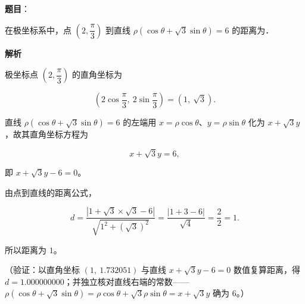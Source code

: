 \begin{answer}

\textbf{题目}：

在极坐标系中，点 \(\left(2,\dfrac{\pi}{3}\right)\) 到直线 \(\rho\left(\cos\theta+\sqrt{3}\sin\theta\right)=6\) 的距离为\gkblank{}．

\textbf{解析}

极坐标点 \(\left(2,\dfrac{\pi}{3}\right)\) 的直角坐标为

\nopagebreak[4]
\[
\left(2\cos\frac{\pi}{3},\ 2\sin\frac{\pi}{3}\right)=(1,\ \sqrt{3}).
\]

直线 \(\rho(\cos\theta+\sqrt{3}\sin\theta)=6\) 的左端用 \(x=\rho\cos\theta\)、\(y=\rho\sin\theta\) 化为 \(x+\sqrt{3}y\)，故其直角坐标方程为

\nopagebreak[4]
\[
x+\sqrt{3}y=6,
\]

即 \(x+\sqrt{3}y-6=0\)。

由点到直线的距离公式，

\nopagebreak[4]
\[
d=\frac{\left|1+\sqrt{3}\times\sqrt{3}-6\right|}{\sqrt{1^{2}+(\sqrt{3})^{2}}}=\frac{\left|1+3-6\right|}{\sqrt{4}}=\frac{2}{2}=1.
\]

所以距离为 \(1\)。

（验证：以直角坐标 \((1,\ 1.732051)\) 与直线 \(x+\sqrt{3}y-6=0\) 数值复算距离，得 \(d=1.000000000\)；并独立核对直线右端的常数——\(\rho(\cos\theta+\sqrt{3}\sin\theta)=\rho\cos\theta+\sqrt{3}\rho\sin\theta=x+\sqrt{3}y\) 确为 \(6\)。）


\end{answer}
